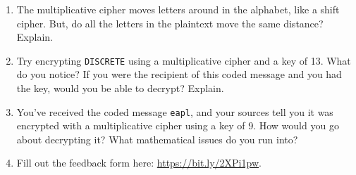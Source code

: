 \documentclass[11 pt]{article}
\begin{document}
\begin{enumerate}
	\item The multiplicative cipher moves letters around in the alphabet, like a shift cipher. But, do all the letters in the plaintext move the same distance? Explain. 
	
	\item Try encrypting \texttt{DISCRETE} using a multiplicative cipher and a key of 13. What do you notice? If you were the recipient of this coded message and you had the key, would you be able to decrypt? Explain.  
	
	\item You've received the coded message \texttt{eapl}, and your sources tell you it was encrypted with a multiplicative cipher using a key of 9. How would you go about decrypting it? What mathematical issues do you run into? 
	
	\item Fill out the feedback form here: \url{https://bit.ly/2XPi1pw}. 
	
\end{enumerate}
\end{document}
